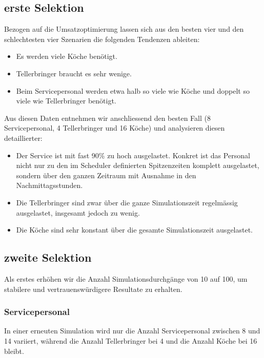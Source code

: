 \documentclass[ngerman,a4paper,12pt]{scrreprt}
\begin{document}
		\subsection{erste Selektion}
			Bezogen auf die Umsatzoptimierung lassen sich aus den besten vier und den schlechtesten vier Szenarien die folgenden Tendenzen ableiten:
			\begin{itemize}
				\item Es werden viele Köche benötigt. 
				\item Tellerbringer braucht es sehr wenige.
				\item Beim Servicepersonal werden etwa halb so viele wie Köche und doppelt so viele wie Tellerbringer benötigt.
			\end{itemize}
		
			Aus diesen Daten entnehmen wir anschliessend den besten Fall (8 Servicepersonal, 4 Tellerbringer und 16 Köche) und analysieren diesen detaillierter:
		
			\begin{itemize}
				\item Der Service ist mit fast 90\% zu hoch ausgelastet. Konkret ist das Personal nicht nur zu den im Scheduler definierten Spitzenzeiten komplett ausgelastet, sondern über den ganzen Zeitraum mit Ausnahme in den Nachmittagsstunden. 				
				\item Die Tellerbringer sind zwar über die ganze Simulationszeit regelmässig ausgelastet, insgesamt jedoch zu wenig.
				\item Die Köche sind sehr konstant über die gesamte Simulationszeit ausgelastet.
			\end{itemize}
			
			
		\subsection{zweite Selektion}
			Als erstes erhöhen wir die Anzahl Simulationsdurchgänge von 10 auf 100, um stabilere und vertrauenswürdigere Resultate zu erhalten.
			
			\subsubsection{Servicepersonal}
				In einer erneuten Simulation wird nur die Anzahl Servicepersonal zwischen 8 und 14 variiert, während die Anzahl Tellerbringer bei 4 und die Anzahl Köche bei 16 bleibt.
				
\end{document}

